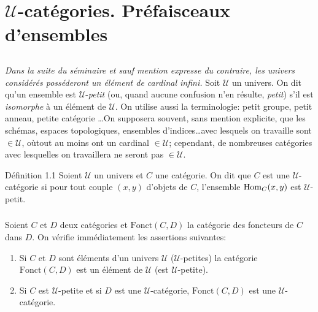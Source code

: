 \documentclass[10pt]{../fichiers-configuration-latex/smfart}
\begin{document}
\section{$𝒰$-catégories. Préfaisceaux d'ensembles}

\setcounter{subsection}{-1}
\subsection{}
\emph{Dans la suite du séminaire et sauf mention expresse du
  contraire, les univers considérés posséderont un élément
  de cardinal infini.} Soit $𝒰$ un univers. On dit qu'un ensemble
  est $𝒰$-\emph{petit} (ou, quand aucune confusion n'en résulte,
  \emph{petit}) s'il est \emph{isomorphe} à un élément de
  $𝒰$. On utilise aussi la terminologie: petit groupe, petit anneau,
  petite catégorie
  \ldots On supposera souvent, sans mention
  explicite, que les schémas, espaces topologiques, ensembles
  d'indices\ldots avec lesquels on travaille sont $\in 𝒰$,
où\pageoriginale tout au moins ont un cardinal $\in 𝒰$;
  cependant, de nombreuses catégories avec lesquelles on travaillera
  ne seront pas $\in 𝒰$.

\begin{enonce*}{Définition 1.1}
Soient $𝒰$ un univers et $C$ une catégorie. On dit que $C$
est une $𝒰$-catégorie si pour tout couple $(x,y)$ d'objets
de $C$, l'ensemble $\operatorname{Hom}_C(x,y)$ est $𝒰$-petit.
\end{enonce*}

\setcounter{subsection}{1}
\subsubsection{}
Soient $C$ et $D$ deux catégories et $\text{Fonct}(C,D)$ la
catégorie des foncteurs de $C$ dans $D$. On vérifie immédiatement
les assertions suivantes:
\begin{enumerate}
\item[a)] Si $C$ et $D$ sont éléments d'un univers $𝒰$
  (\resp  $𝒰$-petites) la catégorie $\text{Fonct}(C,D)$ est un élément
  de $𝒰$ (\resp  est $𝒰$-petite).

\item[b)] Si $C$ est $𝒰$-petite et si $D$ est une $𝒰$-catégorie,
  $\text{Fonct}(C,D)$ est une $𝒰$-catégorie.
\end{enumerate}
\end{document}
